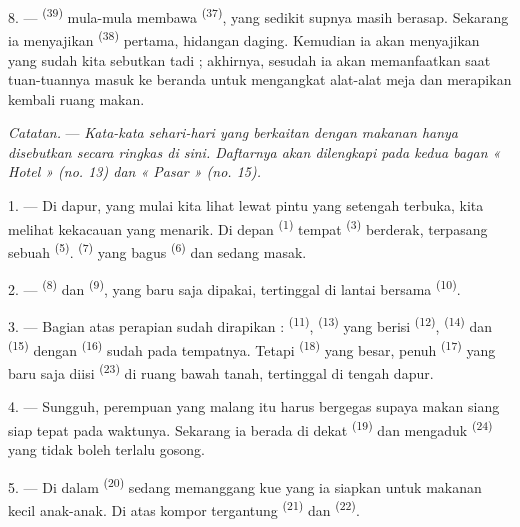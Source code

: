 8. ---  \textsuperscript{(39)} mula-mula membawa
 \textsuperscript{(37)}, yang sedikit supnya masih
berasap. Sekarang ia menyajikan 
\textsuperscript{(38)} pertama, hidangan daging. Kemudian ia akan
menyajikan yang sudah kita sebutkan tadi ; akhirnya, sesudah
 ia akan memanfaatkan saat tuan-tuannya
masuk ke beranda untuk mengangkat alat-alat meja dan merapikan kembali
ruang makan.

\textit{Catatan.} --- \textit{Kata-kata sehari-hari yang berkaitan
dengan makanan hanya disebutkan secara ringkas di sini. Daftarnya akan
dilengkapi pada kedua bagan « Hotel » (no. 13) dan « Pasar » (no.
15).}

\VUsaut{4.6mm}
\VUsaut{3.0mm}

1. --- Di dapur, yang mulai kita lihat lewat pintu yang setengah
terbuka, kita melihat kekacauan yang menarik. Di depan 
\textsuperscript{(1)} tempat  \textsuperscript{(3)}
berderak, terpasang sebuah 
\textsuperscript{(5)}.  \textsuperscript{(7)}
yang bagus  \textsuperscript{(6)} dan sedang masak.

2. ---  \textsuperscript{(8)} dan  \textsuperscript{(9)}, yang baru saja dipakai, tertinggal di
lantai bersama  \textsuperscript{(10)}.

3. --- Bagian atas perapian sudah dirapikan : 
\textsuperscript{(11)},  \textsuperscript{(13)}
yang berisi  \textsuperscript{(12)},  \textsuperscript{(14)} dan 
\textsuperscript{(15)} dengan  \textsuperscript{(16)}
sudah pada tempatnya. Tetapi 
\textsuperscript{(18)} yang besar, penuh 
\textsuperscript{(17)} yang baru saja diisi 
\textsuperscript{(23)} di ruang bawah tanah, tertinggal di tengah
dapur.

4. --- Sungguh, perempuan yang malang itu harus bergegas supaya makan
siang siap tepat pada waktunya. Sekarang ia berada di dekat
 \textsuperscript{(19)} dan mengaduk 
\textsuperscript{(24)} yang tidak boleh terlalu gosong.

5. --- Di dalam  \textsuperscript{(20)} sedang memanggang
kue yang ia siapkan untuk makanan kecil anak-anak. Di atas kompor
tergantung  \textsuperscript{(21)} dan
 \textsuperscript{(22)}.

